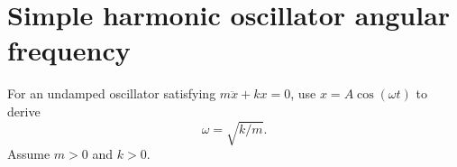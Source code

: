 %
%
%
%

\section*{Simple harmonic oscillator angular frequency}
For an undamped oscillator satisfying $m\ddot{x}+kx=0$, use
$x=A\cos(\omega t)$ to derive
\[
  \omega=\sqrt{k/m}.
\]
Assume $m>0$ and $k>0$.
